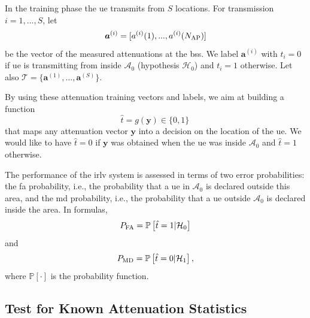 \documentclass[conference,final]{IEEEtran}
\newcommand{\pr}[1]{\mathbb{P} \left[ #1 \right]}
\begin{document}
In the training phase the \ac{ue} transmits from $S$ locations. For transmission $i=1,...,S$, let
\begin{equation}
    \bm{a}^{(i)}=[a^{(i)}(1),...,a^{(i)}(N_{\rm AP})]
\end{equation}
be the vector of the measured attenuations at the  \acp{bs}. We label $\bm a ^{(i)}$ with $t_i=0$ if \ac{ue} is transmitting from inside $\mathcal{A}_0$ (hypothesis $\mathcal{H}_0$) and $t_i=1$ otherwise. Let also $\mathcal{T} =
 \{\bm{a}^{(1)}, \dots , \bm{a}^{(S)} \}$.

By using these attenuation training vectors and labels, we aim at building a function
\begin{equation}
    \hat{t} = g(\bm{y}) \in \{0,1\}\,
\end{equation}
that maps any attenuation vector $\bm{y}$ into a decision on the location of the \ac{ue}. We would like to have $\hat{t}=0$ if $\bm{y}$ was obtained when the \ac{ue} was inside $\mathcal{A}_0$ and $\hat{t}=1$ otherwise.

The performance of the \ac{irlv} system is assessed in terms of two error probabilities: the \ac{fa} probability, i.e., the probability  that a \ac{ue} in $\mathcal A_0$ is declared outside this area, and the \ac{md} probability, i.e., the probability that a \ac{ue} outside $\mathcal A_0$ is declared inside the area. In formulas, 
\begin{equation}
P_{\rm FA} =\pr{\hat{t} =1 | \mathcal H_0}
\end{equation} 
and  
\begin{equation}
 P_{\rm MD}=\pr{\hat{t} = 0 | \mathcal H_1},   
\end{equation}
where $\pr{\cdot}$ is the probability function.

\subsection{Test for Known Attenuation Statistics}
\end{document}
